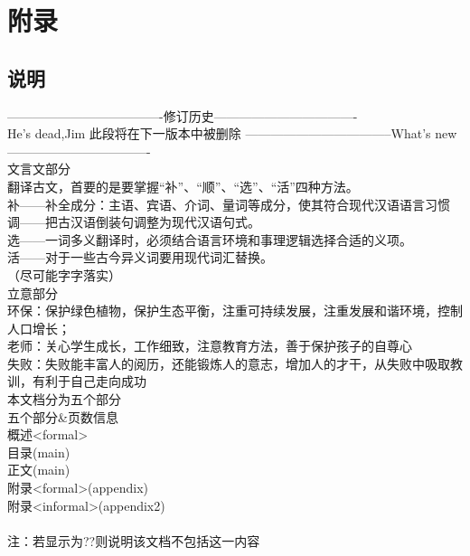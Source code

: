 \appendix
{}
\section{附录}
\subsection{说明}
-------------------------------------修订历史----------------------------------\\
He's dead,Jim
此段将在下一版本中被删除
-----------------------------------What's new----------------------------------\\
文言文部分\\
翻译古文，首要的是要掌握“补”、“顺”、“选”、“活”四种方法。\\
补——补全成分：主语、宾语、介词、量词等成分，使其符合现代汉语语言习惯\\
调——把古汉语倒装句调整为现代汉语句式。\\
选——一词多义翻译时，必须结合语言环境和事理逻辑选择合适的义项。\\
活——对于一些古今异义词要用现代词汇替换。\\
（尽可能字字落实）
\\
立意部分\\
环保：保护绿色植物，保护生态平衡，注重可持续发展，注重发展和谐环境，控制人口增长；\\
老师：关心学生成长，工作细致，注意教育方法，善于保护孩子的自尊心\\
失败：失败能丰富人的阅历，还能锻炼人的意志，增加人的才干，从失败中吸取教训，有利于自己走向成功\\
本文档分为五个部分\\
五个部分\&页数信息\\
概述<formal>\pageref{abstractformal}\\
目录(main)\pageref{contents}\\
正文(main)\pageref{main}\\
附录<formal>(appendix)\pageref{appendixformal}\\
附录<informal>(appendix2)\pageref{appendixinformal}\\
\\
注：若显示为??则说明该文档不包括这一内容\label{appendixformal} \\
\\ 